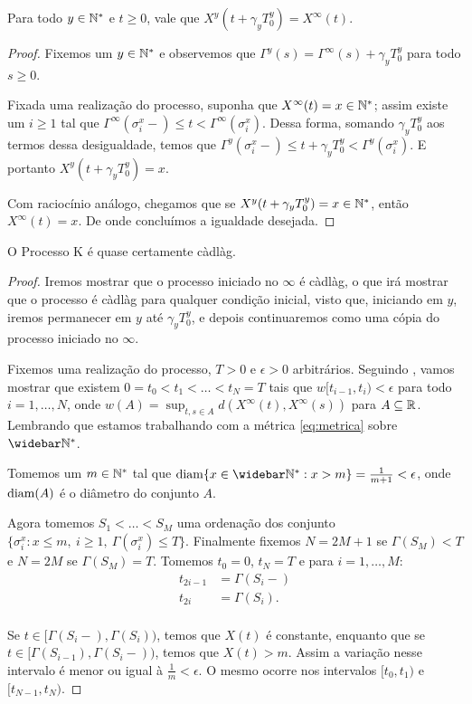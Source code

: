\begin{proposicao}
  \label{prop:reinicia-infinito}
  Para todo $y \in {\mathbb{N^*}}$ e $t \geq 0$, vale que
  $X^y(t + \gamma_y T_0^y) = X^\infty(t)$.
\end{proposicao}
\begin{proof}
  Fixemos um $y \in {\mathbb{N^*}}$ e observemos que $\Gamma^y(s) =
  \Gamma^\infty(s) + \gamma_yT^y_0$ para todo $s \geq 0$.

  Fixada uma realização do processo, suponha que $X^\infty(t) = x \in
  {\mathbb{N^*}}$; assim existe um $i \geq 1$ tal que $\Gamma^\infty(\sigma_i^x-)
  \leq t < \Gamma^\infty(\sigma_i^x)$. Dessa forma, somando $\gamma_y
  T^y_0$ aos termos dessa desigualdade, temos que
  $\Gamma^y(\sigma_i^x-) \leq t+\gamma_yT_0^y <
  \Gamma^y(\sigma_i^x)$. E portanto $X^y(t+\gamma_y T_0^y) = x$.

  Com raciocínio análogo, chegamos que se $X^y(t+\gamma_y T_0^y) = x
  \in {\mathbb{N^*}}$, então $X^\infty(t) = x$. De onde concluímos a igualdade
  desejada.
\end{proof}


\begin{proposicao}
  \label{prop:proc-cadlag}
  O Processo K é quase certamente càdlàg.
\end{proposicao}
\begin{proof}

  Iremos mostrar que o processo iniciado no $\infty$ é càdlàg, o que
  irá mostrar que o processo é càdlàg para qualquer condição inicial,
  visto que, iniciando em $y$, iremos permanecer em $y$ até $\gamma_y
  T^y_0$, e depois continuaremos como uma cópia do processo iniciado
  no $\infty$.

  Fixemos uma realização do processo, $T > 0$ e $\epsilon > 0$
  arbitrários. Seguindo \cite{billingsley:99}, vamos mostrar que
  existem $0 = t_0 < t_1 < \ldots < t_N = T$ tais que $w[t_{i-1}, t_i)
  < \epsilon$ para todo $i = 1, \ldots, N$, onde $w(A) = \sup_{t, s
    \in A} d(X^\infty(t), X^\infty(s))$ para $A \subseteq
  {\mathbb{R}}$. Lembrando que estamos trabalhando com a métrica
  \eqref{eq:metrica} sobre $\Nzb$.

  Tomemos um $m \in {\mathbb{N^*}}$ tal que $\diam\{x \in \Nzb: x > m \} =
  \frac{1}{m+1} < \epsilon$, onde ${\mathrm{diam}}(A)$ é o diâmetro do conjunto
  $A$.

  Agora tomemos $S_1 < \ldots < S_M$ uma ordenação dos conjunto $\{
  \sigma^x_i: x \leq m, \: i \geq 1, \: \Gamma(\sigma^x_i) \leq
  T\}$. Finalmente fixemos $N = 2M+1$ se $\Gamma(S_M) < T$ e $N = 2M$
  se $\Gamma(S_M) = T$. Tomemos $t_0 = 0$, $t_N = T$ e para $i=1,\ldots, M$:
  \begin{align*}
    t_{2i-1} &= \Gamma(S_i-)\\
    t_{2i} &= \Gamma(S_i).\\
  \end{align*}

  Se $t \in [\Gamma(S_i-), \Gamma(S_i))$, temos que $X(t)$ é
  constante, enquanto que se $t \in [\Gamma(S_{i-1}),
  \Gamma(S_{i}-))$, temos que $X(t) > m$. Assim a variação nesse
  intervalo é menor ou igual à $\frac{1}{m} < \epsilon$. O mesmo
  ocorre nos intervalos $[t_0, t_1)$ e $[t_{N-1}, t_N)$.
\end{proof}

